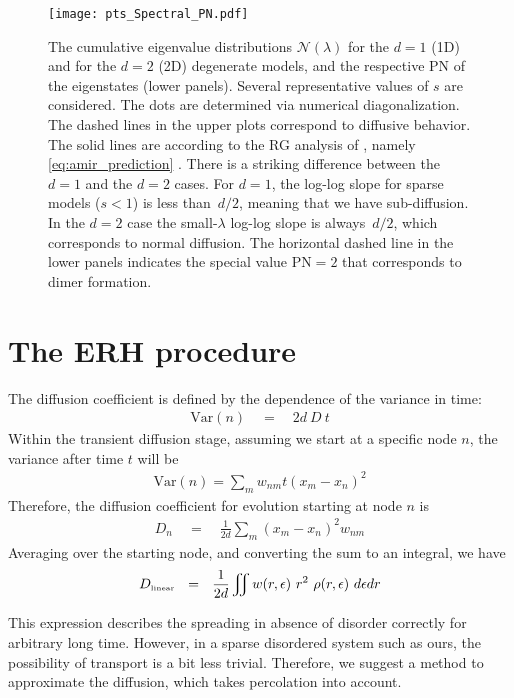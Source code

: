 \begin{figure}
\texttt{[image: pts\_Spectral\_PN.pdf]}

\caption{ 
The cumulative eigenvalue distributions $\mathcal{N}(\lambda)$ 
for the $d{=}1$ (1D) and for the $d{=}2$ (2D) degenerate models, 
and the respective PN of the eigenstates (lower panels).
Several representative values of $s$ are considered.
% 
The dots are determined via numerical diagonalization. 
The dashed lines in the upper plots correspond to diffusive behavior.  
The solid lines are according to the RG analysis of 
\cite{amir_localization_2010,*amir_mean-field_2008}, namely 
\autoref{eq:amir_prediction} . 
%
There is a striking difference between the $d{=}1$ and the $d{=}2$ cases. 
For $d{=}1$, the log-log slope for sparse models ($s<1$) is less than~$d/2$, 
meaning that we have sub-diffusion. In the $d{=}2$ case the small-$\lambda$ log-log slope 
is always~$d/2$, which corresponds to normal diffusion.
%
The horizontal dashed line in the lower panels indicates 
the special value PN$=2$ that corresponds to dimer formation.
} 
\label{fig:spectral}
\end{figure}

\section{The ERH procedure}

The diffusion coefficient is defined by the dependence
of the variance in time:
%
\begin{align}
\textrm{Var}(n) \quad =\quad 2d\ D\ t
\end{align}
%
Within the transient diffusion stage,
assuming we start at a specific node $n$, the variance after time
$t$ will be
%
\begin{align}
\textrm{Var}(n) = \sum_m w_{nm} t (x_m-x_n)^2
\end{align}
Therefore, the diffusion coefficient for evolution 
starting at node $n$ is
%
\begin{align}
D_n \quad=\quad \frac{1}{2d}\sum_m (x_m-x_n)^2 w_{nm}
\end{align}
%
Averaging over the starting node, and converting the sum to an integral,
we have
%
\begin{align}\label{eq:linear_D}
D_{\tbox{linear}}  \ \ = \ \ \frac{1}{2d}\iint w(r,\epsilon) \ r^2  \ \rho(r,\epsilon) \ d\epsilon dr 
\end{align}
%

This expression describes the spreading in absence of disorder correctly
for arbitrary long time. However, in a sparse disordered system such as ours,
the possibility of transport is a bit less trivial. Therefore, we suggest
a method to approximate the diffusion, which takes percolation into account.



